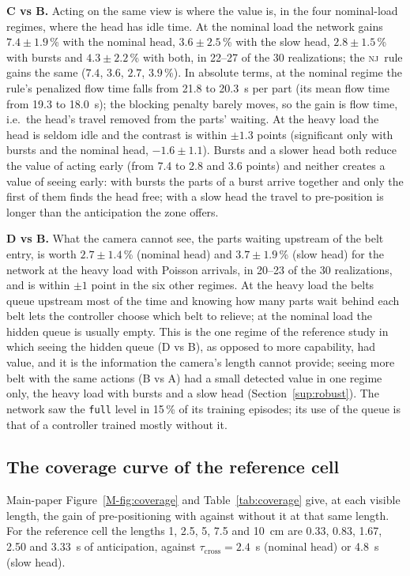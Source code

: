\documentclass[11pt,a4paper]{article}
\newcommand{\nj}{\textsc{nj}}
\newcommand{\tcross}{\tau_{\mathrm{cross}}}
\begin{document}
\textbf{C vs B.} Acting on the same view is where the value is, in the four nominal-load
regimes, where the head has idle time. At the nominal load the network gains $7.4\pm1.9$\,\% with the nominal head,
$3.6\pm2.5$\,\% with the slow head, $2.8\pm1.5$\,\% with bursts and $4.3\pm2.2$\,\% with
both, in 22--27 of the 30 realizations; the \nj\ rule gains the same ($7.4$, $3.6$, $2.7$,
$3.9$\,\%). In absolute terms, at the nominal regime the rule's penalized flow time falls
from 21.8 to 20.3~s per part (its mean flow time from 19.3 to 18.0~s); the blocking
penalty barely moves, so the gain is flow time, i.e.\ the head's travel removed from the
parts' waiting. At the heavy load the head is seldom idle and the contrast is within
$\pm1.3$ points (significant only with bursts and the nominal head, $-1.6\pm1.1$). Bursts
and a slower head both reduce the value of acting early (from 7.4 to 2.8 and 3.6 points)
and neither creates a value of seeing early: with bursts the parts of a burst arrive
together and only the first of them finds the head free; with a slow head the travel to
pre-position is longer than the anticipation the zone offers.

\textbf{D vs B.} What the camera cannot see, the parts waiting upstream of the belt entry,
is worth $2.7\pm1.4$\,\% (nominal head) and $3.7\pm1.9$\,\% (slow head) for the network at
the heavy load with Poisson arrivals, in 20--23 of the 30 realizations, and is within
$\pm1$ point in the six other regimes. At the heavy load the belts queue upstream most of
the time and knowing how many parts wait behind each belt lets the controller choose
which belt to relieve; at the nominal load the hidden queue is usually empty. This is the
one regime of the reference study in which seeing the hidden queue (D vs B), as opposed
to more capability, had value, and it is the information the camera's length cannot
provide; seeing more belt with the same actions (B vs A) had a small detected value in
one regime only, the heavy load with bursts and a slow head (Section~\ref{sup:robust}). The network saw the \texttt{full} level in 15\,\% of its training episodes; its use of
the queue is that of a controller trained mostly without it.

\subsection{The coverage curve of the reference cell}\label{sup:coverage}
Main-paper Figure~\ref{M-fig:coverage} and Table~\ref{tab:coverage} give, at each visible length, the
gain of pre-positioning with against without it at that same length. For the reference
cell the lengths 1, 2.5, 5, 7.5 and 10~cm are 0.33, 0.83, 1.67, 2.50 and 3.33~s of
anticipation, against $\tcross=2.4$~s (nominal head) or 4.8~s (slow head).
\end{document}
